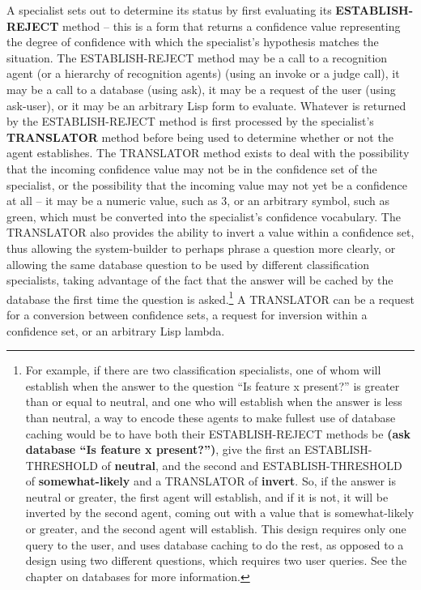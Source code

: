 A specialist sets out to determine its status by first evaluating its
{\bf ESTABLISH-REJECT} method -- this is a form that returns a
confidence value representing the degree of confidence with which the
specialist's hypothesis matches the situation. The ESTABLISH-REJECT
method may be a call to a recognition agent (or a hierarchy of
recognition agents) (using an invoke or a judge call), it may be a
call to a database (using ask), it may be a request of the user (using
ask-user), or it may be an arbitrary Lisp form to evaluate. Whatever
is returned by the ESTABLISH-REJECT method is first processed by the
specialist's {\bf TRANSLATOR} method before being used to determine
whether or not the agent establishes. The TRANSLATOR method exists to
deal with the possibility that the incoming confidence value may not
be in the confidence set of the specialist, or the possibility that
the incoming value may not yet be a confidence at all -- it may be a
numeric value, such as 3, or an arbitrary symbol, such as green, which
must be converted into the specialist's confidence vocabulary. The
TRANSLATOR also provides the ability to invert a value within a
confidence set, thus allowing the system-builder to perhaps phrase a
question more clearly, or allowing the same database question to be
used by different classification specialists, taking advantage of the
fact that the answer will be cached by the database the first time the
question is asked.\footnote{For example, if there are two
classification specialists, one of whom will establish when the answer
to the question ``Is feature x present?'' is greater than or equal to
neutral, and one who will establish when the answer is less than
neutral, a way to encode these agents to make fullest use of database
caching would be to have both their ESTABLISH-REJECT methods be {\bf
(ask database ``Is feature x present?'')}, give the first an
ESTABLISH-THRESHOLD of {\bf neutral}, and the second and
ESTABLISH-THRESHOLD of {\bf somewhat-likely} and a TRANSLATOR of {\bf
invert}. So, if the answer is neutral or greater, the first agent will
establish, and if it is not, it will be inverted by the second agent,
coming out with a value that is somewhat-likely or greater, and the
second agent will establish. This design requires only one query to
the user, and uses database caching to do the rest, as opposed to a
design using two different questions, which requires two user queries.
See the chapter on databases for more information.} A TRANSLATOR can
be a request for a conversion between confidence sets, a request for
inversion within a confidence set, or an arbitrary Lisp lambda.

